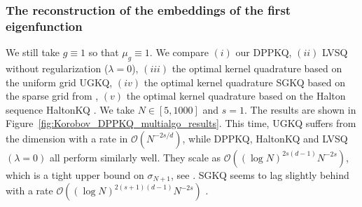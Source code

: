 \documentclass[twoside,11pt]{book}
\numberwithin{theorem}{chapter}
\numberwithin{definition}{chapter}
\numberwithin{proposition}{chapter}
\numberwithin{corollary}{chapter}
\numberwithin{example}{chapter}
\numberwithin{lemma}{chapter}
\begin{document}
\subsubsection{The reconstruction of the embeddings of the first eigenfunction}
We still take $g\equiv 1$ so that $\mu_{g} \equiv 1$. We compare $(i)$ our DPPKQ, $(ii)$ LVSQ without regularization ($\lambda =0$), $(iii)$ the optimal kernel quadrature based on the uniform grid UGKQ, $(iv)$ the optimal kernel quadrature SGKQ based on the sparse grid from \citep{Smo63}, $(v)$ the optimal kernel quadrature based on the Halton sequence HaltonKQ \citep{Hal64}. We take $N \in [5,1000]$ and $s =1$. The results are shown in Figure~\ref{fig:Korobov_DPPKQ_multialgo_results}. This time, UGKQ suffers from the dimension with a rate in $\mathcal{O}(N^{-2s/d})$, while DPPKQ, HaltonKQ and LVSQ $(\lambda = 0)$ all perform similarly well. They scale as $\mathcal{O}((\log N)^{2s(d-1)} N^{-2s})$, which is a tight upper bound on $\sigma_{N+1}$, see \citep{Bac17}.
 SGKQ seems to lag slightly behind with a rate $\mathcal{O}((\log N)^{2(s+1)(d-1)} N^{-2s})$ 
 \citep{Hol08,Smo63}.
\end{document}

